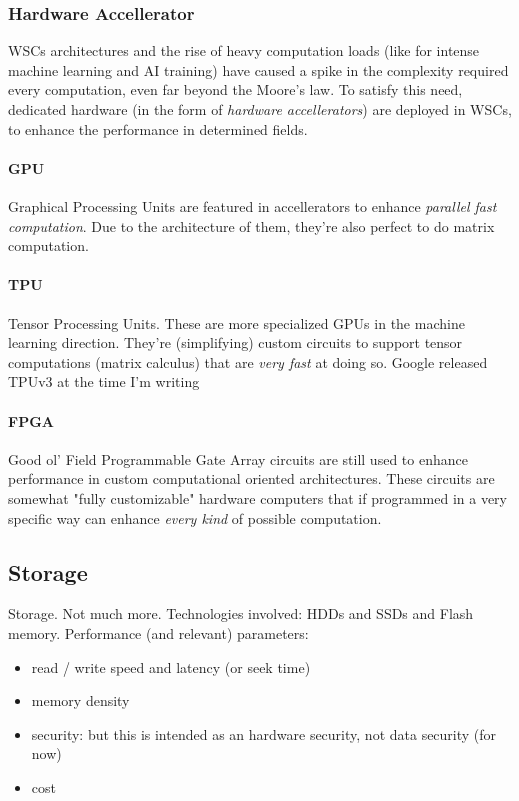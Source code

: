 \documentclass{article}
\begin{document}
				\subsubsection{Hardware Accellerator}
					WSCs architectures and the rise of heavy computation loads (like for intense machine learning and AI training) have caused a spike in the complexity required every computation, even far beyond the Moore's law. To satisfy this need, dedicated hardware (in the form of \emph{hardware accellerators}) are deployed in WSCs, to enhance the performance in determined fields.
					
					\paragraph{GPU}
						Graphical Processing Units are featured in accellerators to enhance \emph{parallel fast computation}. Due to the architecture of them, they're also perfect to do matrix computation. 
						
					\paragraph{TPU}
						Tensor Processing Units. These are more specialized GPUs in the machine learning direction. They're (simplifying) custom circuits to support tensor computations (matrix calculus) that are \emph{very fast} at doing so. Google released TPUv3 at the time I'm writing
						
					\paragraph{FPGA}
						Good ol' Field Programmable Gate Array circuits are still used to enhance performance in custom computational oriented architectures. These circuits are somewhat "fully customizable" hardware computers that if programmed in a very specific way can enhance \emph{every kind} of possible computation. 
			
			\subsection{Storage}
				Storage. Not much more. Technologies involved: HDDs and SSDs and Flash memory. Performance (and relevant) parameters:
				\begin{itemize}
					\item read / write speed and latency (or seek time)
					\item memory density
					\item security: but this is intended as an hardware security, not data security (for now)
					\item cost
				\end{itemize}
				
\end{document}
